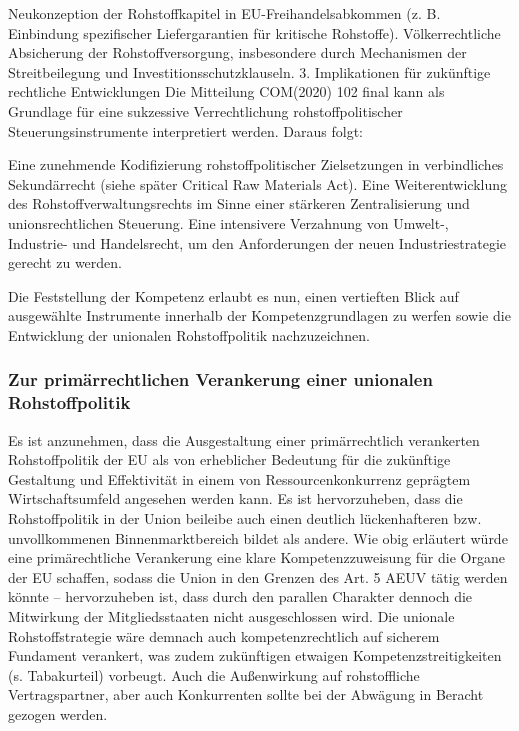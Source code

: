 \documentclass[12pt,a4paper,oneside]{book} %
\begin{document}
Neukonzeption der Rohstoffkapitel in EU-Freihandelsabkommen (z. B. Einbindung spezifischer Liefergarantien für kritische Rohstoffe).
Völkerrechtliche Absicherung der Rohstoffversorgung, insbesondere durch Mechanismen der Streitbeilegung und Investitionsschutzklauseln.
3. Implikationen für zukünftige rechtliche Entwicklungen
Die Mitteilung COM(2020) 102 final kann als Grundlage für eine sukzessive Verrechtlichung rohstoffpolitischer Steuerungsinstrumente interpretiert werden. Daraus folgt:

Eine zunehmende Kodifizierung rohstoffpolitischer Zielsetzungen in verbindliches Sekundärrecht (siehe später Critical Raw Materials Act).
Eine Weiterentwicklung des Rohstoffverwaltungsrechts im Sinne einer stärkeren Zentralisierung und unionsrechtlichen Steuerung.
Eine intensivere Verzahnung von Umwelt-, Industrie- und Handelsrecht, um den Anforderungen der neuen Industriestrategie gerecht zu werden.

Die Feststellung der Kompetenz erlaubt es nun, einen vertieften Blick auf ausgewählte Instrumente innerhalb der Kompetenzgrundlagen zu werfen sowie die Entwicklung der unionalen Rohstoffpolitik nachzuzeichnen.

	
\subsubsection{Zur primärrechtlichen Verankerung einer unionalen Rohstoffpolitik}
Es ist anzunehmen, dass die Ausgestaltung einer primärrechtlich verankerten Rohstoffpolitik der EU als von erheblicher Bedeutung für die zukünftige Gestaltung und Effektivität in einem von Ressourcenkonkurrenz geprägtem Wirtschaftsumfeld angesehen werden kann. Es ist hervorzuheben, dass die Rohstoffpolitik in der Union beileibe auch einen deutlich lückenhafteren bzw. unvollkommenen Binnenmarktbereich bildet als andere.  Wie obig erläutert würde eine primärechtliche Verankerung eine klare Kompetenzzuweisung für die Organe der EU schaffen, sodass die Union in den Grenzen des Art. 5 AEUV tätig werden könnte -- hervorzuheben ist, dass durch den parallen Charakter dennoch die Mitwirkung der Mitgliedsstaaten nicht ausgeschlossen wird. Die unionale Rohstoffstrategie wäre demnach auch kompetenzrechtlich auf sicherem Fundament verankert, was zudem zukünftigen etwaigen Kompetenzstreitigkeiten (s. Tabakurteil) vorbeugt. Auch die Außenwirkung auf rohstoffliche Vertragspartner, aber auch Konkurrenten sollte bei der Abwägung in Beracht gezogen werden.
\end{document}
